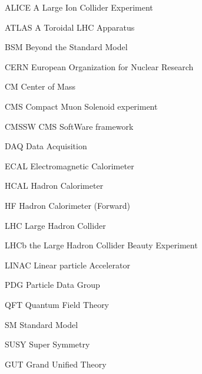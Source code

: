 \begin{theglossary}
\item[ALICE] A Large Ion Collider Experiment
\item[ATLAS] A Toroidal LHC Apparatus
\item[BSM] Beyond the Standard Model
\item[CERN] European Organization for Nuclear Research
\item[CM] Center of Mass
\item[CMS] Compact Muon Solenoid experiment
\item[CMSSW] CMS SoftWare framework
\item[DAQ] Data Acquisition
\item[ECAL] Electromagnetic Calorimeter
\item[HCAL] Hadron Calorimeter
\item[HF] Hadron Calorimeter (Forward)
\item[LHC] Large Hadron Collider
\item[LHCb] the Large Hadron Collider Beauty Experiment
\item[LINAC] Linear particle Accelerator
\item[PDG] Particle Data Group
\item[QFT] Quantum Field Theory
\item[SM] Standard Model
\item[SUSY] Super Symmetry
\item[GUT] Grand Unified Theory
\end{theglossary}

